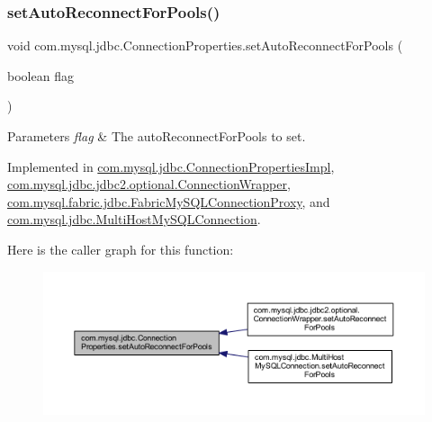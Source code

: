 \subsubsection{\texorpdfstring{set\+Auto\+Reconnect\+For\+Pools()}{setAutoReconnectForPools()}}
{\footnotesize\ttfamily void com.\+mysql.\+jdbc.\+Connection\+Properties.\+set\+Auto\+Reconnect\+For\+Pools (\begin{DoxyParamCaption}\item[{boolean}]{flag }\end{DoxyParamCaption})}


\begin{DoxyParams}{Parameters}
{\em flag} & The auto\+Reconnect\+For\+Pools to set. \\
\hline
\end{DoxyParams}


Implemented in \mbox{\hyperlink{classcom_1_1mysql_1_1jdbc_1_1_connection_properties_impl_a4c1e9d8e06680eeaaa1a916289f55f1e}{com.\+mysql.\+jdbc.\+Connection\+Properties\+Impl}}, \mbox{\hyperlink{classcom_1_1mysql_1_1jdbc_1_1jdbc2_1_1optional_1_1_connection_wrapper_ae86cd6b7f7098459fecb312efd62181d}{com.\+mysql.\+jdbc.\+jdbc2.\+optional.\+Connection\+Wrapper}}, \mbox{\hyperlink{classcom_1_1mysql_1_1fabric_1_1jdbc_1_1_fabric_my_s_q_l_connection_proxy_a86183ddf2c7c2488c77b99c974a2122b}{com.\+mysql.\+fabric.\+jdbc.\+Fabric\+My\+S\+Q\+L\+Connection\+Proxy}}, and \mbox{\hyperlink{classcom_1_1mysql_1_1jdbc_1_1_multi_host_my_s_q_l_connection_a74082ba356c0d803169347d2abae7efa}{com.\+mysql.\+jdbc.\+Multi\+Host\+My\+S\+Q\+L\+Connection}}.

Here is the caller graph for this function\+:\nopagebreak
\begin{figure}[H]
\begin{center}
\leavevmode
\includegraphics[width=350pt]{interfacecom_1_1mysql_1_1jdbc_1_1_connection_properties_afd29baec0fcca703af94fac13342e6bf_icgraph}
\end{center}
\end{figure}
\mbox{\label{interfacecom_1_1mysql_1_1jdbc_1_1_connection_properties_ab16063397e021c5f18662127d274d4d5}} 
